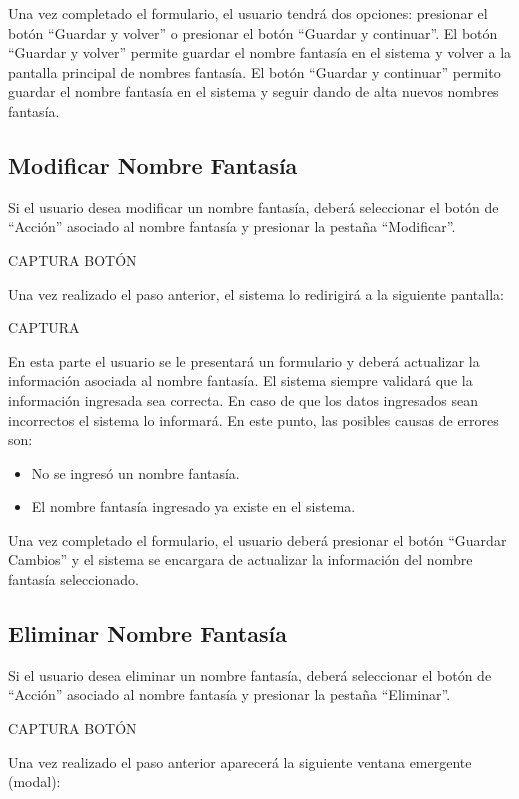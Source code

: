 \documentclass[letterpaper,10pt,spanish]{sphinxmanual}
\begin{document}
Una vez completado el formulario, el usuario tendrá dos opciones: presionar el botón “Guardar y volver” o presionar el botón “Guardar y continuar”.
El botón “Guardar y volver” permite guardar el nombre fantasía en el sistema y volver a la pantalla principal de nombres fantasía.
El botón “Guardar y continuar” permito guardar el nombre fantasía en el sistema y seguir dando de alta nuevos nombres fantasía.


\subsection{Modificar Nombre Fantasía}
\label{nombresfantasia:modificar-nombre-fantasia}
Si el usuario desea modificar un nombre fantasía, deberá seleccionar el botón de “Acción” asociado al nombre fantasía y presionar la pestaña “Modificar”.

CAPTURA BOTÓN

Una vez realizado el paso anterior, el sistema lo redirigirá a la siguiente pantalla:

CAPTURA

En esta parte el usuario se le presentará un formulario y deberá actualizar la información asociada al nombre fantasía.
El sistema siempre validará que la información ingresada sea correcta. En caso de que los datos ingresados sean incorrectos el sistema lo informará.
En este punto, las posibles causas de errores son:
\begin{itemize}
\item {} 
No se ingresó un nombre fantasía.

\item {} 
El nombre fantasía ingresado ya existe en el sistema.

\end{itemize}

Una vez completado el formulario, el usuario deberá presionar el botón “Guardar Cambios” y el sistema se encargara de actualizar la información del nombre fantasía seleccionado.


\subsection{Eliminar Nombre Fantasía}
\label{nombresfantasia:eliminar-nombre-fantasia}
Si el usuario desea eliminar un nombre fantasía, deberá seleccionar el botón de “Acción” asociado al nombre fantasía y presionar la pestaña “Eliminar”.

CAPTURA BOTÓN

Una vez realizado el paso anterior aparecerá la siguiente ventana emergente (modal):
\end{document}
